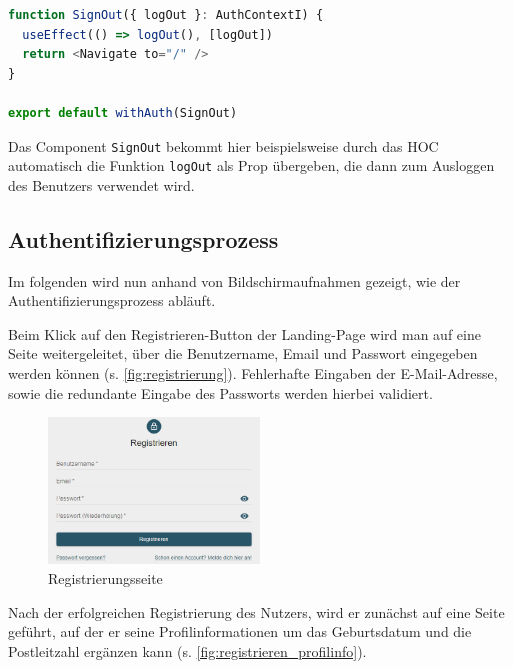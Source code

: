 \begin{lstlisting}[language=JavaScript, caption=Verwendung des Authentifizierungscontext-HOCs, label={lst:authcontext_impl}]
function SignOut({ logOut }: AuthContextI) {
  useEffect(() => logOut(), [logOut])
  return <Navigate to="/" />
}

export default withAuth(SignOut)  
\end{lstlisting}

Das Component \texttt{SignOut} bekommt hier beispielsweise durch das HOC automatisch die Funktion \texttt{logOut} als Prop übergeben, die dann zum Ausloggen des Benutzers verwendet wird.

\subsection{Authentifizierungsprozess}
\label{sec:authentifizierungsprozess}

Im folgenden wird nun anhand von Bildschirmaufnahmen gezeigt, wie der Authentifizierungsprozess abläuft.

Beim Klick auf den Registrieren-Button der Landing-Page wird man auf eine Seite weitergeleitet, über die Benutzername, Email und Passwort eingegeben werden können (s. \autoref{fig:registrierung}). Fehlerhafte Eingaben der E-Mail-Adresse, sowie die redundante Eingabe des Passworts werden hierbei validiert.

\begin{figure}[!htb]
    \centering
    \includegraphics[width=0.5\textwidth]{figures/boas/21_registrieren.png}
    \caption[]{Registrierungsseite}
    \label{fig:registrierung}
\end{figure}

Nach der erfolgreichen Registrierung des Nutzers, wird er zunächst auf eine Seite geführt, auf der er seine Profilinformationen um das Geburtsdatum und die Postleitzahl ergänzen kann (s. \autoref{fig:registrieren_profilinfo}).

